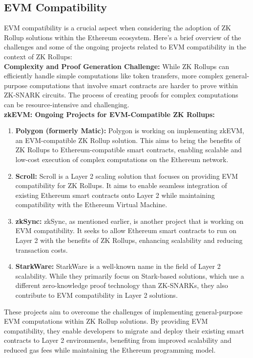 \subsection{EVM Compatibility}
EVM compatibility is a crucial aspect when considering the adoption of ZK Rollup solutions within the Ethereum ecosystem. Here's a brief overview of the challenges and some of the ongoing projects related to EVM compatibility in the context of ZK Rollups:\\
\textbf{Complexity and Proof Generation Challenge:} While ZK Rollups can efficiently handle simple computations like token transfers, more complex general-purpose computations that involve smart contracts are harder to prove within ZK-SNARK circuits. The process of creating proofs for complex computations can be resource-intensive and challenging.\\
\textbf{zkEVM: Ongoing Projects for EVM-Compatible ZK Rollups:}\\
\begin{enumerate}
	\item \textbf{Polygon (formerly Matic):} Polygon is working on implementing zkEVM, an EVM-compatible ZK Rollup solution. This aims to bring the benefits of ZK Rollups to Ethereum-compatible smart contracts, enabling scalable and low-cost execution of complex computations on the Ethereum network.
	\item \textbf{Scroll:} Scroll is a Layer 2 scaling solution that focuses on providing EVM compatibility for ZK Rollups. It aims to enable seamless integration of existing Ethereum smart contracts onto Layer 2 while maintaining compatibility with the Ethereum Virtual Machine.
	\item \textbf{zkSync:} zkSync, as mentioned earlier, is another project that is working on EVM compatibility. It seeks to allow Ethereum smart contracts to run on Layer 2 with the benefits of ZK Rollups, enhancing scalability and reducing transaction costs.
	\item \textbf{StarkWare:} StarkWare is a well-known name in the field of Layer 2 scalability. While they primarily focus on Stark-based solutions, which use a different zero-knowledge proof technology than ZK-SNARKs, they also contribute to EVM compatibility in Layer 2 solutions.
\end{enumerate}
These projects aim to overcome the challenges of implementing general-purpose EVM computations within ZK Rollup solutions. By providing EVM compatibility, they enable developers to migrate and deploy their existing smart contracts to Layer 2 environments, benefiting from improved scalability and reduced gas fees while maintaining the Ethereum programming model.
